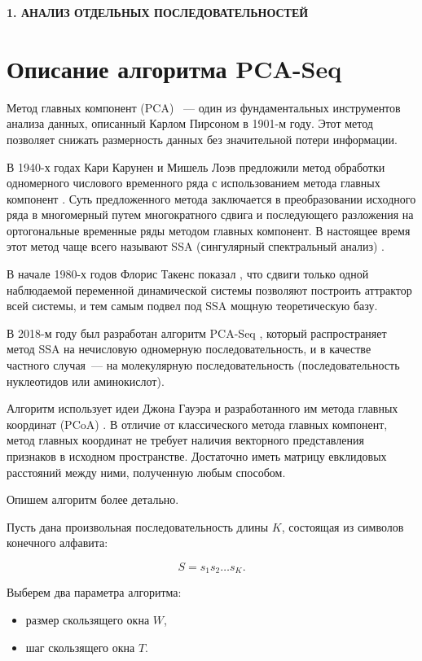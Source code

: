 \newpage
\begin{center}
  \textbf{\large 1. АНАЛИЗ ОТДЕЛЬНЫХ ПОСЛЕДОВАТЕЛЬНОСТЕЙ}
\end{center}

\section{Описание алгоритма PCA-Seq}

Метод главных компонент (PCA) \cite{pearson1901}~--- один из фундаментальных инструментов анализа данных, описанный Карлом Пирсоном в 1901-м году. Этот метод позволяет снижать размерность данных без значительной потери информации.

В 1940-х годах Кари Карунен и Мишель Лоэв предложили метод обработки одномерного числового временного ряда с использованием метода главных компонент \cite{karhunen, loeve}. Суть предложенного метода заключается в преобразовании исходного ряда в многомерный путем многократного сдвига и последующего разложения на ортогональные временные ряды методом главных компонент. В настоящее время этот метод чаще всего называют SSA (сингулярный спектральный анализ) \cite{Golyandina2013}.

В начале 1980-х годов Флорис Такенс показал \cite{takens}, что сдвиги только одной наблюдаемой переменной динамической системы позволяют построить аттрактор всей системы, и тем самым подвел под SSA мощную теоретическую базу.

В 2018-м году был разработан алгоритм PCA-Seq \cite{Efimov2020}, который распространяет метод SSA на нечисловую одномерную последовательность, и в качестве частного случая~--- на молекулярную последовательность (последовательность нуклеотидов или аминокислот).

Алгоритм использует идеи Джона Гауэра и разработанного им метода главных координат (PCoA) \cite{Gower1966}. В отличие от классического метода главных компонент, метод главных координат не требует наличия векторного представления признаков в исходном пространстве. Достаточно иметь матрицу евклидовых расстояний между ними, полученную любым способом.

Опишем алгоритм более детально.

Пусть дана произвольная последовательность длины $K$, состоящая из символов конечного алфавита:

$$S = s_1s_2\ldots s_K.$$ 

Выберем два параметра алгоритма:
\begin{itemize}
  \item размер скользящего окна $W$,
  \item шаг скользящего окна $T$.
\end{itemize}


